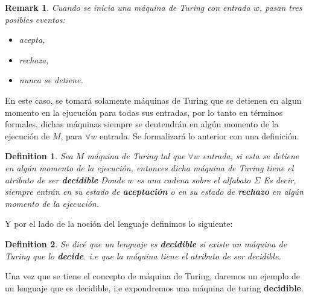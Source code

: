 \documentclass[10pt]{report}
\newtheorem*{remark}{Remark}
\newtheorem{definition}{Definition}
\begin{document}
    \begin{remark}
        Cuando se inicia una máquina de Turing con entrada $w$, pasan tres posibles eventos:
        \begin{itemize}
            \item acepta,
            \item rechaza,
            \item nunca se detiene.
        \end{itemize}
    \end{remark}
    En este caso, se tomará solamente máquinas de Turing que se detienen en algun momento en la ejucución para todas sus entradas,
    por lo tanto en términos formales, dichas máquinas siempre se dentendrán en algún momento de la
    ejecución de $M$, para $\forall w$ entrada.
    Se formalizará lo anterior con una definición.
    \begin{definition}
        Sea $M$ máquina de Turing tal que $\forall w$ entrada, si esta se detiene en algún momento de la ejecución,
        entonces dicha máquina de Turing tiene el atributo de ser
        \textbf{decidible}\newline
        Donde $w$ es una cadena sobre el alfabato $\Sigma$
        Es decir, siempre entrán en su estado de \textbf{aceptación}
        o en su estado de \textbf{rechazo} en algún momento de la ejecución.
    \end{definition}
    Y por el lado de la noción del lenguaje definimos lo siguiente:
    \begin{definition}
        Se dicé que un lenguaje es \textbf{decidible} si existe un máquina de Turing
        que lo \textbf{decide}.
        i.e que la máquina tiene el atributo de ser decidible.
    \end{definition}
    Una vez que se tiene el concepto de máquina de Turing, daremos un ejemplo de un lenguaje que es decidible,
    i.e expondremos una máquina de turing \textbf{decidible}.
\end{document}
